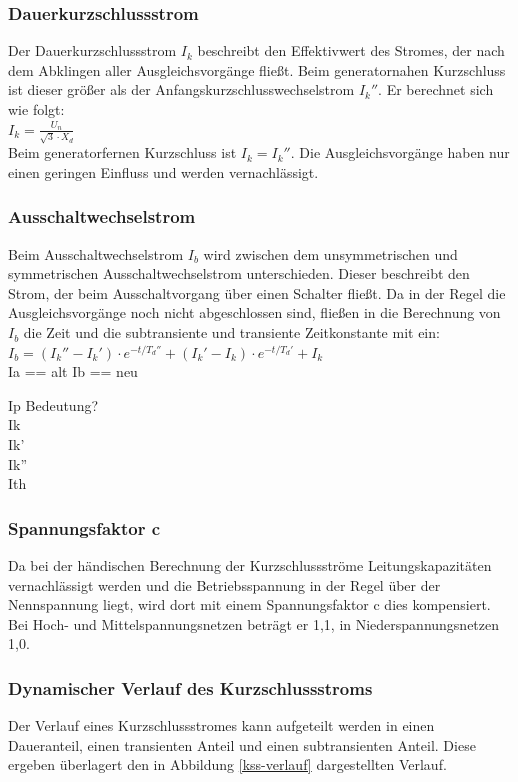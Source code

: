 \documentclass{scrartcl}
\begin{document}
\begin{onehalfspace}
\subsubsection{Dauerkurzschlussstrom}
Der Dauerkurzschlussstrom $I_k$ beschreibt den Effektivwert des Stromes, der nach dem Abklingen aller Ausgleichsvorgänge fließt. Beim generatornahen Kurzschluss ist dieser größer als der Anfangskurzschlusswechselstrom $I_k''$. Er berechnet sich wie folgt: \\

$I_k = \frac{U_n}{\sqrt{3} \cdot X_d}$ \\

 Beim generatorfernen Kurzschluss ist $I_k = I_k''$. Die Ausgleichsvorgänge haben nur einen geringen Einfluss und werden vernachlässigt.

\subsubsection{Ausschaltwechselstrom}
Beim Ausschaltwechselstrom $I_b$ wird zwischen dem unsymmetrischen und symmetrischen Ausschaltwechselstrom unterschieden. Dieser beschreibt den Strom, der beim Ausschaltvorgang über einen Schalter fließt. Da in der Regel die Ausgleichsvorgänge noch nicht abgeschlossen sind, fließen in die Berechnung von $I_b$ die Zeit und die  subtransiente und transiente Zeitkonstante mit ein: \\

$I_b = (I_k'' - I_k') \cdot e ^{-t/T_d''} +  (I_k' - I_k) \cdot e ^{-t/T_d'} + I_k$ \\

Ia == alt Ib == neu

Ip Bedeutung?\\
Ik \\
Ik' \\
Ik'' \\
Ith \\

\subsubsection{Spannungsfaktor c}
Da bei der händischen Berechnung der Kurzschlussströme Leitungskapazitäten vernachlässigt werden und die Betriebsspannung in der Regel über der Nennspannung liegt, wird dort mit einem Spannungsfaktor c dies kompensiert. Bei Hoch- und Mittelspannungsnetzen beträgt er 1,1, in Niederspannungsnetzen 1,0.

\subsubsection{Dynamischer Verlauf des Kurzschlussstroms}
Der Verlauf eines Kurzschlussstromes kann aufgeteilt werden in einen Daueranteil, einen transienten Anteil und einen subtransienten Anteil. Diese ergeben überlagert den in Abbildung \ref{kss-verlauf} dargestellten Verlauf.


\end{onehalfspace}
\end{document}
